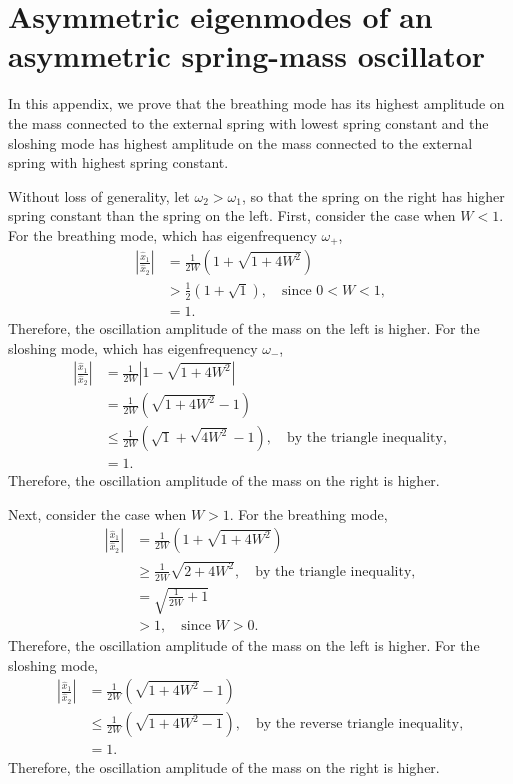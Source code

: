 \documentclass[12pt,draft]{../style-files/ociamthesis}
\begin{document}
\appendix
\section{Asymmetric eigenmodes of an asymmetric spring-mass oscillator} \label{app: coupled oscillator modes}
In this appendix, we prove that the breathing mode has its highest amplitude on the mass connected to the external spring with lowest spring constant and the sloshing mode has highest amplitude on the mass connected to the external spring with highest spring constant.

Without loss of generality, let $\omega_2 > \omega_1$, so that the spring on the right has higher spring constant than the spring on the left. First, consider the case when $W < 1$. For the breathing mode, which has eigenfrequency $\omega_+$,
\begin{align}
	\left| \frac{\hat{x}_1}{\hat{x}_2} \right| & = \frac{1}{2W} \left(1 + \sqrt{1 + 4W^2}\right) \\
	& >  \frac{1}{2} \left(1 + \sqrt{1}\right), \quad \text{since $0 < W < 1$,} \\
	& = 1.
\end{align}
Therefore, the oscillation amplitude of the mass on the left is higher. For the sloshing mode, which has eigenfrequency $\omega_-$,
\begin{align}
	\left| \frac{\hat{x}_1}{\hat{x}_2} \right| & = \frac{1}{2W} \left|1 - \sqrt{1 + 4W^2}\right| \\
	& = \frac{1}{2W} \left(\sqrt{1 + 4W^2} - 1\right) \\
	& \leq \frac{1}{2W} \left(\sqrt{1} + \sqrt{4W^2} - 1\right), \quad \text{by the triangle inequality,} \\
	& = 1.
\end{align}
Therefore, the oscillation amplitude of the mass on the right is higher.

Next, consider the case when $W > 1$. For the breathing mode,
\begin{align}
\left| \frac{\hat{x}_1}{\hat{x}_2} \right| & = \frac{1}{2W} \left(1 + \sqrt{1 + 4W^2}\right) \\
& \geq \frac{1}{2W} \sqrt{2 + 4W^2}, \quad \text{by the triangle inequality,} \\
& = \sqrt{\frac{1}{2W} + 1} \\
& > 1,  \quad \text{since $W > 0$.}
\end{align}
Therefore, the oscillation amplitude of the mass on the left is higher. For the sloshing mode,
\begin{align}
\left| \frac{\hat{x}_1}{\hat{x}_2} \right| & = \frac{1}{2W} \left(\sqrt{1 + 4W^2} - 1\right) \\
& \leq \frac{1}{2W} \left(\sqrt{1 + 4W^2 - 1}\right), \quad \text{by the reverse triangle inequality,} \\
& = 1.
\end{align}
Therefore, the oscillation amplitude of the mass on the right is higher.
\end{document}
